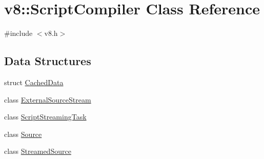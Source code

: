 \hypertarget{classv8_1_1ScriptCompiler}{}\section{v8\+:\+:Script\+Compiler Class Reference}
\label{classv8_1_1ScriptCompiler}


{\ttfamily \#include $<$v8.\+h$>$}

\subsection*{Data Structures}
\begin{DoxyCompactItemize}
\item 
struct \mbox{\hyperlink{structv8_1_1ScriptCompiler_1_1CachedData}{Cached\+Data}}
\item 
class \mbox{\hyperlink{classv8_1_1ScriptCompiler_1_1ExternalSourceStream}{External\+Source\+Stream}}
\item 
class \mbox{\hyperlink{classv8_1_1ScriptCompiler_1_1ScriptStreamingTask}{Script\+Streaming\+Task}}
\item 
class \mbox{\hyperlink{classv8_1_1ScriptCompiler_1_1Source}{Source}}
\item 
class \mbox{\hyperlink{classv8_1_1ScriptCompiler_1_1StreamedSource}{Streamed\+Source}}
\end{DoxyCompactItemize}
